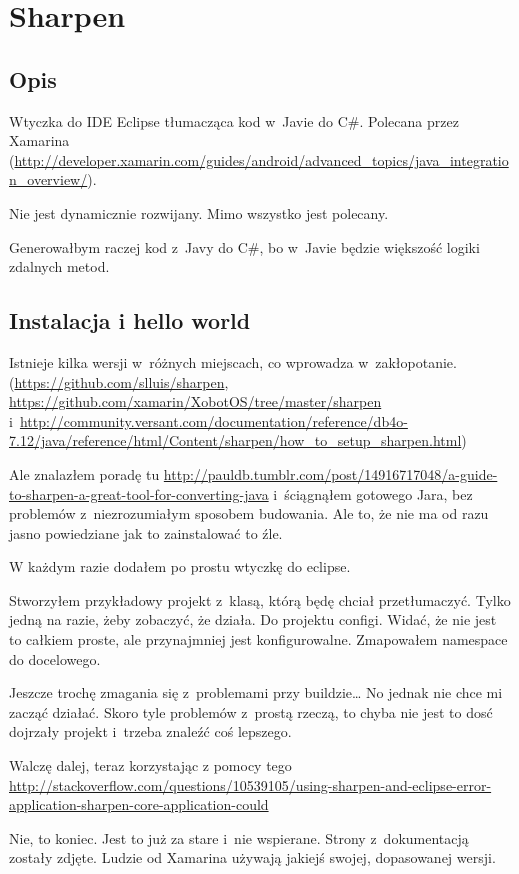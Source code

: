 \section{Sharpen}
\subsection{Opis}
Wtyczka do IDE Eclipse tłumacząca kod w~Javie do C\#.
Polecana przez Xamarina (\url{http://developer.xamarin.com/guides/android/advanced_topics/java_integration_overview/}).

Nie jest dynamicznie rozwijany. Mimo wszystko jest polecany.

Generowałbym raczej kod z~Javy do C\#, bo w~Javie będzie większość logiki zdalnych metod.

\subsection{Instalacja i hello world}
Istnieje kilka wersji w~różnych miejscach, co wprowadza w~zakłopotanie. (\url{https://github.com/slluis/sharpen}, \url{https://github.com/xamarin/XobotOS/tree/master/sharpen} i~\url{http://community.versant.com/documentation/reference/db4o-7.12/java/reference/html/Content/sharpen/how_to_setup_sharpen.html})

Ale znalazłem poradę tu \url{http://pauldb.tumblr.com/post/14916717048/a-guide-to-sharpen-a-great-tool-for-converting-java} i~ściągnąłem gotowego Jara, bez problemów z~niezrozumiałym sposobem budowania.
Ale to, że nie ma od razu jasno powiedziane jak to zainstalować to źle.

W każdym razie dodałem po prostu wtyczkę do eclipse.

Stworzyłem przykładowy projekt z~klasą, którą będę chciał przetłumaczyć. Tylko jedną na razie, żeby zobaczyć, że działa.
Do projektu configi. Widać, że nie jest to całkiem proste, ale przynajmniej jest konfigurowalne.
Zmapowałem namespace do docelowego.

Jeszcze trochę zmagania się z~problemami przy buildzie\ldots{} No jednak nie chce mi zacząć działać. Skoro tyle problemów z~prostą rzeczą, to chyba nie jest to dosć dojrzały projekt i~trzeba znaleźć coś lepszego.

Walczę dalej, teraz korzystając z pomocy tego \url{http://stackoverflow.com/questions/10539105/using-sharpen-and-eclipse-error-application-sharpen-core-application-could}

Nie, to koniec. Jest to już za stare i~nie wspierane. Strony z~dokumentacją zostały zdjęte. Ludzie od Xamarina używają jakiejś swojej, dopasowanej wersji.

